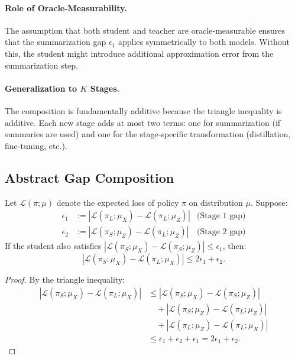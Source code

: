 \paragraph{Role of Oracle-Measurability.}
The assumption that both student and teacher are oracle-measurable ensures that the summarization gap $\epsilon_1$ applies symmetrically to both models. Without this, the student might introduce additional approximation error from the summarization step.

\paragraph{Generalization to $K$ Stages.}
The composition is fundamentally additive because the triangle inequality is additive. Each new stage adds at most two terms: one for summarization (if summaries are used) and one for the stage-specific transformation (distillation, fine-tuning, etc.).

\subsection{Abstract Gap Composition}

\begin{theorem}\label{thm:path-gap}
Let $\mathcal{L}(\pi; \mu)$ denote the expected loss of policy $\pi$ on distribution $\mu$. Suppose:
\begin{align}
\epsilon_1 &:= |\mathcal{L}(\pi_L; \mu_X) - \mathcal{L}(\pi_L; \mu_Z)| & \text{(Stage 1 gap)} \\
\epsilon_2 &:= |\mathcal{L}(\pi_S; \mu_Z) - \mathcal{L}(\pi_L; \mu_Z)| & \text{(Stage 2 gap)}
\end{align}
If the student also satisfies $|\mathcal{L}(\pi_S; \mu_X) - \mathcal{L}(\pi_S; \mu_Z)| \le \epsilon_1$, then:
\[
|\mathcal{L}(\pi_S; \mu_X) - \mathcal{L}(\pi_L; \mu_X)| \le 2\epsilon_1 + \epsilon_2.
\]
\end{theorem}

\begin{proof}
By the triangle inequality:
\begin{align*}
|\mathcal{L}(\pi_S; \mu_X) - \mathcal{L}(\pi_L; \mu_X)|
&\le |\mathcal{L}(\pi_S; \mu_X) - \mathcal{L}(\pi_S; \mu_Z)| \\
&\quad + |\mathcal{L}(\pi_S; \mu_Z) - \mathcal{L}(\pi_L; \mu_Z)| \\
&\quad + |\mathcal{L}(\pi_L; \mu_Z) - \mathcal{L}(\pi_L; \mu_X)| \\
&\le \epsilon_1 + \epsilon_2 + \epsilon_1 = 2\epsilon_1 + \epsilon_2.
\end{align*}
\end{proof}

